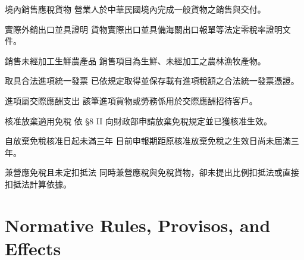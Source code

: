 \documentclass[11pt]{article}
\begin{document}
\begin{soundfact}[id=fact_domestic_sale]{境內銷售應稅貨物}
\label{fact:domestic}
營業人於中華民國境內完成一般貨物之銷售與交付。
\end{soundfact}

\begin{soundfact}[id=fact_export_goods]{實際外銷出口並具證明}
\label{fact:export}
貨物實際出口並具備海關出口報單等法定零稅率證明文件。
\end{soundfact}

\begin{soundfact}[id=fact_fresh_agri]{銷售未經加工生鮮農產品}
\label{fact:agri}
銷售項目為生鮮、未經加工之農林漁牧產物。
\end{soundfact}

\begin{soundfact}[id=fact_input_invoice]{取具合法進項統一發票}
\label{fact:invoice}
已依規定取得並保存載有進項稅額之合法統一發票憑證。
\end{soundfact}

\begin{soundfact}[id=fact_entertainment]{進項屬交際應酬支出}
\label{fact:ent}
該筆進項貨物或勞務係用於交際應酬招待客戶。
\end{soundfact}

\begin{soundfact}[id=fact_waive_approved]{核准放棄適用免稅}
\label{fact:waive}
依 §8 II 向財政部申請放棄免稅規定並已獲核准生效。
\end{soundfact}

\begin{soundfact}[id=fact_within_3yr]{自放棄免稅核准日起未滿三年}
\label{fact:3yr}
目前申報期距原核准放棄免稅之生效日尚未屆滿三年。
\end{soundfact}

\begin{soundfact}[id=fact_mixed_no_ratio]{兼營應免稅且未定扣抵法}
\label{fact:mixed}
同時兼營應稅與免稅貨物，卻未提出比例扣抵法或直接扣抵法計算依據。
\end{soundfact}

\section{Normative Rules, Provisos, and Effects}
\end{document}
